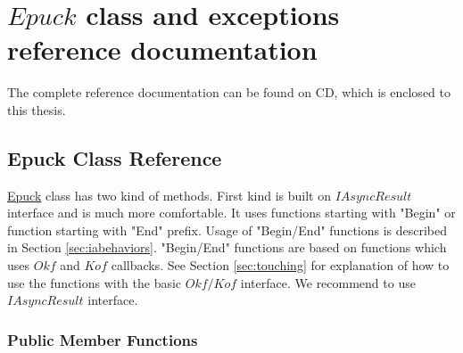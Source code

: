 \chapter{$Epuck$ class and exceptions reference documentation} \label{app:epuckref}
\begin{remark}
The complete reference documentation can be found on CD, which is enclosed
to this thesis.
\end{remark}
\hypertarget{class_elib_1_1_epuck}{
\section{Epuck Class Reference}
\label{class_elib_1_1_epuck}
}
\hyperlink{class_elib_1_1_epuck}{Epuck} class has two kind of methods.
First kind is built on $IAsyncResult$ interface and is much more comfortable.
It uses functions starting with "Begin" or function starting with "End" prefix.
Usage of "Begin/End" functions is described in Section \ref{sec:iabehaviors}.
"Begin/End" functions are based on functions which uses $Okf$ and $Kof$ callbacks.
See Section \ref{sec:touching} for explanation of how to use the functions with
the basic $Okf/Kof$ interface.
We recommend to use $IAsyncResult$ interface.

\subsection*{Public Member Functions}

